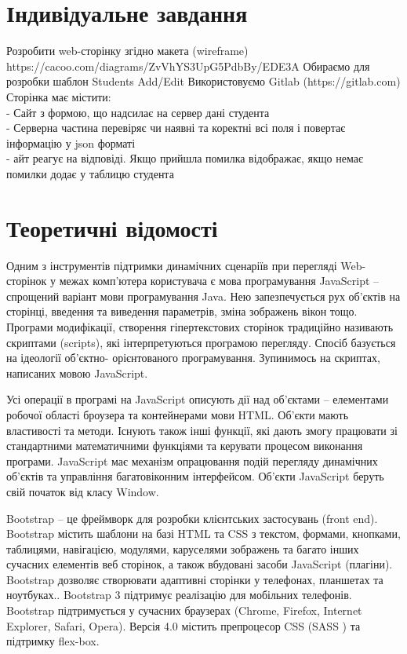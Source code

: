 \documentclass{article}
\begin{document}
\begin{normalsize}
\section*{Індивідуальне завдання}
Розробити web-сторінку згідно макета (wireframe)
https://cacoo.com/diagrams/ZvVhYS3UpG5PdbBy/EDE3A
Обираємо для розробки шаблон Students Add/Edit
Використовуємо Gitlab (https://gitlab.com)
Сторінка має містити:\\
- Сайт з формою, що надсилає на сервер дані студента\\
- Серверна частина перевіряє чи наявні та коректні всі поля і повертає інформацію у json форматі\\
- айт реагує на відповіді. Якщо прийшла помилка відображає, якщо немає помилки додає у
таблицю студента\\

\section*{Теоретичні відомості}
Одним з інструментів підтримки динамічних сценаріїв при перегляді Web-сторінок у
межах комп’ютера користувача є мова програмування JavaScript – спрощений
варіант мови програмування Java. Нею запезпечується рух об’єктів на сторінці,
введення та виведення параметрів, зміна зображень вікон тощо. Програми модифікації,
створення гіпертекстових сторінок традиційно називають скриптами (scripts), які
інтерпретуються програмою перегляду. Спосіб базується на ідеології об’єктно-
орієнтованого програмування. Зупинимось на скриптах, написаних мовою JavaScript.

Усі операції в програмі на JavaScript описують дії над об’єктами – елементами
робочої області броузера та контейнерами мови HTML. Об’єкти мають властивості та
методи. Існують також інші функції, які дають змогу працювати зі стандартними
математичними функціями та керувати процесом виконання програми. JavaScript має
механізм опрацювання подій перегляду динамічних об’єктів та управління
багатовіконним інтерфейсом. Об’єкти JavaScript беруть свій початок від класу
Window.

Bootstrap – це фреймворк для розробки клієнтських застосувань (front end). Bootstrap
містить шаблони на базі HTML та CSS з текстом, формами, кнопками, таблицями,
навігацією, модулями, каруселями зображень та багато інших сучасних елементів веб
сторінок, а також вбудовані засоби JavaScript (плагіни). Bootstrap дозволяє створювати
адаптивні сторінки у телефонах, планшетах та ноутбуках.. Bootstrap 3 підтримує
реалізацію для мобільних телефонів. Bootstrap підтримується у сучасних браузерах
(Chrome, Firefox, Internet Explorer, Safari, Opera). Версія 4.0 містить препроцесор CSS
(SASS ) та підтримку flex-box.


\end{normalsize}
\end{document}
